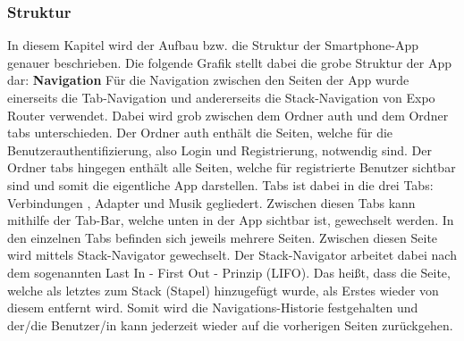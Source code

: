 \documentclass[11pt, twoside]{article}
\begin{document}
\subsubsection{Struktur}
In diesem Kapitel wird der Aufbau bzw. die Struktur der Smartphone-App genauer beschrieben. Die folgende Grafik stellt dabei die grobe Struktur der App dar:
\textbf{Navigation} \newline
Für die Navigation zwischen den Seiten der App wurde einerseits die Tab-Navigation und andererseits die Stack-Navigation von \glqq Expo Router \grqq{} verwendet. Dabei wird grob zwischen dem Ordner \glqq auth \grqq{} und dem Ordner \glqq tabs \grqq{} unterschieden. Der Ordner \glqq auth \grqq{} enthält die Seiten, welche für die Benutzerauthentifizierung, also Login und Registrierung, notwendig sind. Der Ordner \glqq tabs \grqq{} hingegen enthält alle Seiten, welche für registrierte Benutzer sichtbar sind und somit die eigentliche App darstellen. \glqq Tabs \grqq{} ist dabei in die drei Tabs: \glqq Verbindungen \grqq{}, \glqq Adapter \grqq{} und \glqq Musik \grqq{} gegliedert. Zwischen diesen Tabs kann mithilfe der Tab-Bar, welche unten in der App sichtbar ist, gewechselt werden. In den einzelnen Tabs befinden sich jeweils mehrere Seiten. Zwischen diesen Seite wird mittels Stack-Navigator gewechselt. Der Stack-Navigator arbeitet dabei nach dem sogenannten Last In - First Out - Prinzip (LIFO). Das heißt, dass die Seite, welche als letztes zum Stack (Stapel) hinzugefügt wurde, als Erstes wieder von diesem entfernt wird. Somit wird die Navigations-Historie festgehalten und der/die Benutzer/in kann jederzeit wieder auf die vorherigen Seiten zurückgehen. \parencite[vgl.][]{noauthor_urlpi28_nodate}
\end{document}
